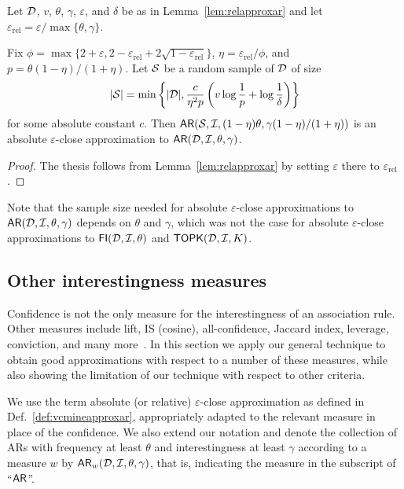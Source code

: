 \begin{lemma}\label{lem:absapproxar}
Let ${\cal D}$, $v$, $\theta$, $\gamma$, $\varepsilon$, and $\delta$ be as in
Lemma~\ref{lem:relapproxar}
and let $\varepsilon_\mathrm{rel}=\varepsilon/\max\{\theta,\gamma\}$.

Fix
$\phi=\max\{2+\varepsilon,2-\varepsilon_\mathrm{rel}+2\sqrt{1-\varepsilon_\mathrm{rel}}\}$,
$\eta=\varepsilon_\mathrm{rel}/\phi$,
and $p=\theta(1-\eta)/(1+\eta)$. Let ${\cal S}$ be a random sample of ${\cal D}$ of
size 
\begin{equation}\label{eq:vcminesamsizeabsapproxar}
|{\cal S}|=\min\left\{|{\cal D}|,\frac{c}{\eta^2p}\left(v\log\frac{1}{p}+\log\frac{1}{\delta}\right)\right\}
\end{equation}
for some absolute constant $c$. Then
$\mathsf{AR}({\cal S},{\cal I},(1-\eta)\theta,\gamma(1-\eta)/(1+\eta))$ is an absolute
$\varepsilon$-close approximation to $\mathsf{AR}({\cal D},{\cal I},\theta,\gamma)$.
\end{lemma}

\begin{proof}
  The thesis follows from Lemma~\ref{lem:relapproxar} by setting $\varepsilon$
  there to $\varepsilon_\mathrm{rel}$.
\end{proof}

Note that the sample size needed for absolute $\varepsilon$-close
approximations to $\mathsf{AR}({\cal D},{\cal I},\theta,\gamma)$ depends on $\theta$ and
$\gamma$, which was not the case for absolute $\varepsilon$-close approximations
to $\mathsf{FI}({\cal D},{\cal I},\theta)$ and $\mathsf{TOPK}({\cal D},{\cal I},K)$.

\subsection{Other interestingness measures}\label{sec:vcminealternative}
Confidence is not the only
measure for the interestingness of an association rule. Other measures include
lift, IS (cosine), all-confidence, Jaccard index, leverage, conviction, and many
more~\citep{TanKS04}. In this section we apply our general technique to obtain good approximations with 
respect to a number of these measures, while also showing the limitation of our technique
with respect to other criteria.

We use the term absolute (or relative) $\varepsilon$-close approximation as
defined in Def.~\ref{def:vcmineapproxar}, appropriately adapted to the relevant
measure in place of the confidence. We also extend our notation and denote the
collection of ARs with frequency at least $\theta$ and interestingness at least
$\gamma$ according to a measure $w$ by $\mathsf{AR}_w({\cal D},{\cal I},\theta,\gamma)$, that is,
indicating the measure in the subscript of ``$\mathsf{AR}$''.

